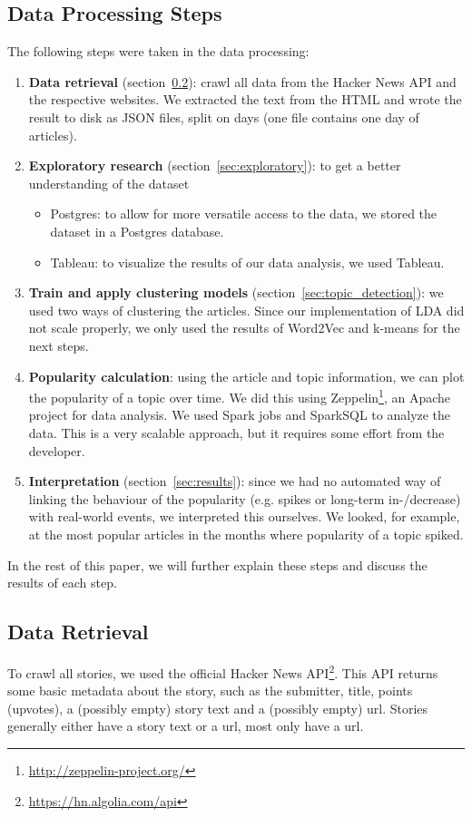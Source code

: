 \subsection{Data Processing Steps}
The following steps were taken in the data processing:
\begin{enumerate}
	\item \textbf{Data retrieval} (section~\ref{sec:retrieval}): crawl all data from the Hacker News API and the respective websites. We extracted the text from the HTML and wrote the result to disk as JSON files, split on days (one file contains one day of articles).
	\item \textbf{Exploratory research} (section~\ref{sec:exploratory}): to get a better understanding of the dataset
		\begin{itemize}
			\item Postgres: to allow for more versatile access to the data, we stored the dataset in a Postgres database.
			\item Tableau: to visualize the results of our data analysis, we used Tableau.
		\end{itemize}
	\item \textbf{Train and apply clustering models} (section~\ref{sec:topic_detection}): we used two ways of clustering the articles. Since our implementation of LDA did not scale properly, we only used the results of Word2Vec and k-means for the next steps.
	\item \textbf{Popularity calculation}: using the article and topic information, we can plot the popularity of a topic over time. We did this using Zeppelin\footnote{\url{http://zeppelin-project.org/}}, an Apache project for data analysis. We used Spark jobs and SparkSQL to analyze the data. This is a very scalable approach, but it requires some effort from the developer.
	\item \textbf{Interpretation} (section~\ref{sec:results}): since we had no automated way of linking the behaviour of the popularity (e.g. spikes or long-term in-/decrease) with real-world events, we interpreted this ourselves. We looked, for example, at the most popular articles in the months where popularity of a topic spiked.
\end{enumerate}

In the rest of this paper, we will further explain these steps and discuss the results of each step.

\subsection{Data Retrieval}
\label{sec:retrieval}
To crawl all stories, we used the official Hacker News API\footnote{\url{https://hn.algolia.com/api}}. This API returns some basic metadata about the story, such as the submitter, title, points (upvotes), a (possibly empty) story text and a (possibly empty) url. Stories generally either have a story text or a url, most only have a url.

